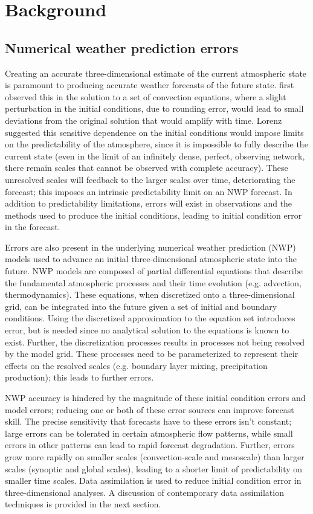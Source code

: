 \chapter{Background}
\section{Numerical weather prediction errors}
Creating an accurate three-dimensional estimate of the current atmospheric state is paramount to producing accurate weather forecasts of the future state. \citet{lorenz63} first observed this in the solution to a set of convection equations, where a slight perturbation in the initial conditions, due to rounding error, would lead to small deviations from the original solution that would amplify with time. Lorenz suggested this sensitive dependence on the initial conditions would impose limits on the predictability of the atmosphere, since it is impossible to fully describe the current state (even in the limit of an infinitely dense, perfect, observing network, there remain scales that cannot be observed with complete accuracy). These unresolved scales will feedback to the larger scales over time, deteriorating the forecast; this imposes an intrinsic predictability limit on an NWP forecast. In addition to predictability limitations, errors will exist in observations and the methods used to produce the initial conditions, leading to initial condition error in the forecast.

Errors are also present in the underlying numerical weather prediction (NWP) models used to advance an initial three-dimensional atmospheric state into the future. NWP models are composed of partial differential equations that describe the fundamental atmospheric processes and their time evolution (e.g. advection, thermodynamics). These equations, when discretized onto a three-dimensional grid, can be integrated into the future given a set of initial and boundary conditions. Using the discretized approximation to the equation set introduces error, but is needed since no analytical solution to the equations is known to exist. Further, the discretization processes results in processes not being resolved by the model grid. These processes need to be parameterized to represent their effects on the resolved scales (e.g. boundary layer mixing, precipitation production); this leads to further errors.

NWP accuracy is hindered by the magnitude of these initial condition errors and model errors; reducing one or both of these error sources can improve forecast skill. The precise sensitivity that forecasts have to these errors isn’t constant; large errors can be tolerated in certain atmospheric flow patterns, while small errors in other patterns can lead to rapid forecast degradation. Further, errors grow more rapidly on smaller scales (convection-scale and mesoscale) than larger scales (synoptic and global scales), leading to a shorter limit of predictability on smaller time scales. Data assimilation is used to reduce initial condition error in three-dimensional analyses. A discussion of contemporary data assimilation techniques is provided in the next section.

